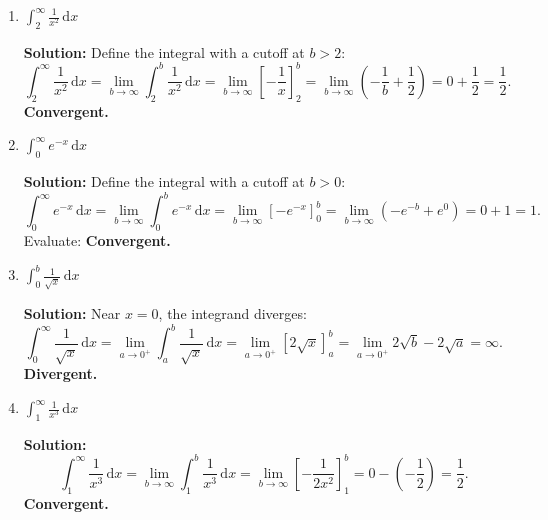\documentclass{article}
\begin{document}
\begin{enumerate}[leftmargin = 0.5cm, label = (\alph*), rightmargin = 0.2cm]

    \item $\int_2^\infty \frac{1}{x^2}\,\mathrm{d}x$

    \textbf{Solution:}
    Define the integral with a cutoff at \(b > 2\):
    \[
    \int_2^\infty \frac{1}{x^2}\,\mathrm{d}x = \lim_{b \to \infty} \int_2^b \frac{1}{x^2}\,\mathrm{d}x = \lim_{b \to \infty} \left[-\frac{1}{x}\right]_2^b = \lim_{b \to \infty} \left(-\frac{1}{b} + \frac{1}{2}\right) = 0 + \frac{1}{2} = \frac{1}{2}.
    \]
    \textbf{Convergent.}

    \item $\int_0^\infty e^{-x}\,\mathrm{d}x$

    \textbf{Solution:}
    Define the integral with a cutoff at \(b > 0\):
    \[
    \int_0^\infty e^{-x}\,\mathrm{d}x = \lim_{b \to \infty} \int_0^b e^{-x}\,\mathrm{d}x = \lim_{b \to \infty} \left[-e^{-x}\right]_0^b = \lim_{b \to \infty} \left(-e^{-b} + e^0\right) = 0 + 1 = 1.
    \]
    Evaluate:
    \textbf{Convergent.}

    \item $\int_0^b \frac{1}{\sqrt{x}}\,\mathrm{d}x$

    \textbf{Solution:}
    Near \(x = 0\), the integrand diverges:
    \[
    \int_0^\infty \frac{1}{\sqrt{x}}\,\mathrm{d}x = \lim_{a \to 0^+} \int_a^b \frac{1}{\sqrt{x}}\,\mathrm{d}x = \lim_{a \to 0^+} \left[2\sqrt{x}\right]_a^b = 
    \lim_{a \to 0^+} 2\sqrt{b} - 2\sqrt{a} = \infty.
    \]
    \textbf{Divergent.}

    \item $\int_1^\infty \frac{1}{x^3} \, \mathrm{d}x$
    
    \textbf{Solution:}
    \[
    \int_1^\infty \frac{1}{x^3} \, \mathrm{d}x = \lim_{b \to \infty} \int_1^b \frac{1}{x^3} \, \mathrm{d}x = \lim_{b \to \infty} \left[-\frac{1}{2x^2}\right]_1^b = 0 - \left(-\frac{1}{2}\right) = \frac{1}{2}.
    \]
    \textbf{Convergent.}

\end{enumerate}
\end{document}
